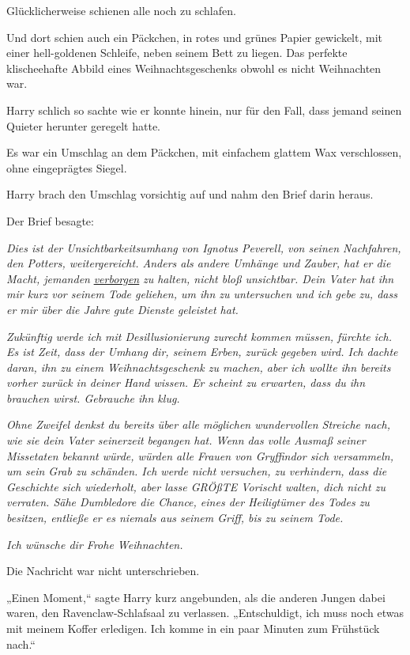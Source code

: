 {Glücklicherweise schienen alle noch zu schlafen.

Und dort schien auch ein Päckchen, in rotes und grünes Papier gewickelt, mit einer hell-goldenen Schleife, neben seinem Bett zu liegen. Das perfekte klischeehafte Abbild eines Weihnachtsgeschenks obwohl es nicht Weihnachten war.

Harry schlich so sachte wie er konnte hinein, nur für den Fall, dass jemand seinen Quieter herunter geregelt hatte.

Es war ein Umschlag an dem Päckchen, mit einfachem glattem Wax verschlossen, ohne eingeprägtes Siegel.

Harry brach den Umschlag vorsichtig auf und nahm den Brief darin heraus.

Der Brief besagte:

\emph{Dies ist der Unsichtbarkeitsumhang von Ignotus Peverell, von seinen Nachfahren, den Potters, weitergereicht. Anders als andere Umhänge und Zauber, hat er die Macht, jemanden} \emph{\uline{verborgen}} \emph{zu halten, nicht bloß unsichtbar. Dein Vater hat ihn mir kurz vor seinem Tode geliehen, um ihn zu untersuchen und ich gebe zu, dass er mir über die Jahre gute Dienste geleistet hat.}

\emph{Zukünftig werde ich mit Desillusionierung zurecht kommen müssen, fürchte ich. Es ist Zeit, dass der Umhang dir, seinem Erben, zurück gegeben wird. Ich dachte daran, ihn zu einem Weihnachtsgeschenk zu machen, aber ich wollte ihn bereits vorher zurück in deiner Hand wissen. Er scheint zu erwarten, dass du ihn brauchen wirst. Gebrauche ihn klug.}

\emph{Ohne Zweifel denkst du bereits über alle möglichen wundervollen Streiche nach, wie sie dein Vater seinerzeit begangen hat. Wenn das volle Ausmaß seiner Missetaten bekannt würde, würden alle Frauen von Gryffindor sich versammeln, um sein Grab zu schänden. Ich werde nicht versuchen, zu verhindern, dass die Geschichte sich wiederholt, aber lasse GRÖßTE Vorischt walten, dich nicht zu verraten. Sähe Dumbledore die Chance, eines der Heiligtümer des Todes zu besitzen, entließe er es niemals aus seinem Griff, bis zu seinem Tode.}

\emph{Ich wünsche dir Frohe Weihnachten.}

Die Nachricht war nicht unterschrieben.

\later

„Einen Moment,“ sagte Harry kurz angebunden, als die anderen Jungen dabei waren, den Ravenclaw-Schlafsaal zu verlassen. „Entschuldigt, ich muss noch etwas mit meinem Koffer erledigen. Ich komme in ein paar Minuten zum Frühstück nach.“

}
